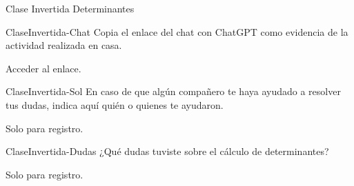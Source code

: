 \documentclass[a4,11pt]{aleph-notas}
\begin{document}
\begin{quiz}{Clase Invertida Determinantes}
    
\begin{essay}[response format=text, response field lines=5]%
    {ClaseInvertida-Chat}
    Copia el enlace del chat con ChatGPT como evidencia de la actividad realizada en casa.
    \item Acceder al enlace.
\end{essay}

\begin{essay}[response format=text, response field lines=5]%
    {ClaseInvertida-Sol}
    En caso de que algún compañero te haya ayudado a resolver tus dudas, indica aquí quién o quienes te ayudaron.
    \item Solo para registro.
\end{essay}

\begin{essay}[response format=text, response field lines=5]%
    {ClaseInvertida-Dudas}
    ¿Qué dudas tuviste sobre el cálculo de determinantes?
    \item Solo para registro.
\end{essay}



\end{quiz}
\end{document}
